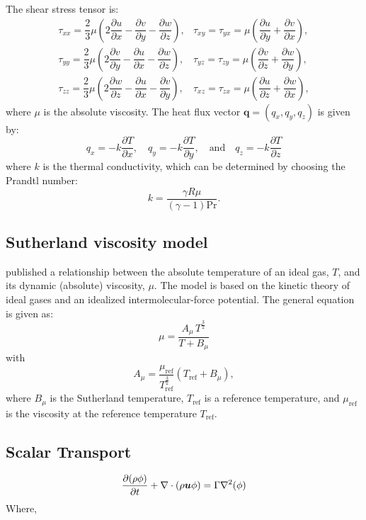 \documentclass[10pt]{article}
\newcommand{\D}{\partial}
\newcommand{\diff}[2] {\dfrac{\partial #1}{\partial #2}}
\newcommand{\bv}[1]{\ensuremath{\mbox{\boldmath$ #1 $}}}
\begin{document}
The shear stress tensor is:
\begin{equation}
 \begin{array}{lll}
  \tau_{xx}= \dfrac{2}{3}  \mu \left( 2 \diff{u}{x} - \diff{v}{y} -\diff{w}{z} \right),
  &\tau_{xy}= \tau_{yx}=\mu \left( \diff{u}{y} + \diff{v}{x}\right),\\
  \tau_{yy}= \dfrac{2}{3}  \mu \left( 2 \diff{v}{y} - \diff{u}{x} -\diff{w}{z} \right),
  &\tau_{yz}= \tau_{zy}=\mu \left( \diff{v}{z} + \diff{w}{y}\right),\\
  \tau_{zz}= \dfrac{2}{3}  \mu \left( 2 \diff{w}{z} - \diff{u}{x} -\diff{v}{y} \right),
  &\tau_{xz}= \tau_{zx}=\mu \left( \diff{u}{z} + \diff{w}{x}\right),
 \end{array}
\end{equation}
where $\mu$ is the absolute viscosity. The heat flux vector $\mathbf{q}=(q_x,q_y,q_z)$ is given by:
\begin{equation}
 q_x = - k \diff{T}{x}, \quad q_y = - k \diff{T}{y}, \quad \mbox{and} \quad q_z = - k \diff{T}{z}
 \end{equation}
where $k$ is the thermal conductivity, which can be determined by choosing the Prandtl number:
$$k= \dfrac{\gamma R \mu}{ (\gamma-1) \text{Pr}}.$$

\subsection{Sutherland viscosity model}

\citet{Sutherland1893} published a relationship between the absolute temperature of an ideal gas, $T$,  and its dynamic (absolute) viscosity, $\mu$. The model is based on the kinetic theory of ideal gases and an idealized intermolecular-force potential. The general equation is given as:
\begin{equation}
\label{eq:Sutherland01}
 \mu  =\dfrac{A_\mu \, T^{\frac{3}{2}}}{T+B_\mu}
\end{equation}
with
$$    A_\mu = \dfrac{\mu_\text{ref}}{T_{\text{ref}}^{\frac{3}{2}}}(T_\text{ref} + B_\mu), $$
%
where $B_\mu$ is the Sutherland temperature, $T_{\text{ref}}$ is a reference temperature,  and $\mu_\text{ref}$ is the viscosity at the reference temperature $T_\text{ref}$.

\subsection{Scalar Transport}

\begin{equation}
  \frac{\D (\rho \phi)}{\D t} + \nabla\cdot\left(\rho\bv{u}\phi\right) = \Gamma \nabla^2 (\phi)
\end{equation}
Where,
\end{document}
